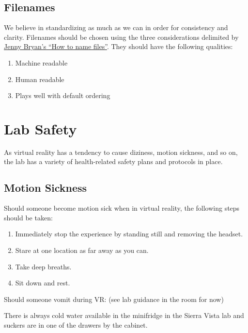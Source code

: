 \documentclass[
]{book}
\providecommand{\tightlist}{%
  \setlength{\itemsep}{0pt}\setlength{\parskip}{0pt}}
\begin{document}
\hypertarget{filenames}{%
\subsection{Filenames}\label{filenames}}

We believe in standardizing as much as we can in order for consistency and clarity. Filenames should be chosen using the three considerations delimited by \href{https://speakerdeck.com/jennybc/how-to-name-files?slide=4}{Jenny Bryan's ``How to name files''}. They should have the following qualities:

\begin{enumerate}
\def\labelenumi{\arabic{enumi}.}
\tightlist
\item
  Machine readable
\item
  Human readable
\item
  Plays well with default ordering
\end{enumerate}

\hypertarget{lab-safety}{%
\section{Lab Safety}\label{lab-safety}}

As virtual reality has a tendency to cause diziness, motion sickness, and so on, the lab has a variety of health-related safety plans and protocols in place.

\hypertarget{motion-sickness}{%
\subsection{Motion Sickness}\label{motion-sickness}}

Should someone become motion sick when in virtual reality, the following steps should be taken:

\begin{enumerate}
\def\labelenumi{\arabic{enumi}.}
\tightlist
\item
  Immediately stop the experience by standing still and removing the headset.
\item
  Stare at one location as far away as you can.
\item
  Take deep breaths.
\item
  Sit down and rest.
\end{enumerate}

Should someone vomit during VR: (see lab guidance in the room for now)

There is always cold water available in the minifridge in the Sierra Vista lab and suckers are in one of the drawers by the cabinet.
\end{document}
